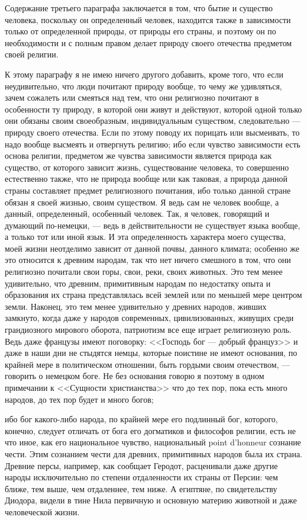 \documentclass[12pt]{article}
\begin{document}
Содержание третьего параграфа заключается в том, что бытие и существо человека, поскольку он определенный человек, находится также в зависимости только от определенной природы, от природы его страны, и поэтому он по необходимости и с полным правом делает природу своего отечества предметом своей религии. 

К этому параграфу я не имею ничего другого добавить, кроме того, что если неудивительно, что люди почитают природу вообще, то чему же удивляться, зачем сожалеть или смеяться над тем, что они религиозно почитают в особенности ту природу, в которой они живут и действуют, которой одной только они обязаны своим своеобразным, индивидуальным существом, следовательно --- природу своего отечества. Если по этому поводу их порицать или высмеивать, то надо вообще высмеять и отвергнуть религию; ибо если чувство зависимости есть основа религии, предметом же чувства зависимости является природа как существо, от которого зависит жизнь, существование человека, то совершенно естественно также, что не природа вообще или как таковая, а природа данной страны составляет предмет религиозного почитания, ибо только данной стране обязан я своей жизнью, своим существом. Я ведь сам не человек вообще, а данный, определенный, особенный человек. Так, я человек, говорящий и думающий по-немецки, --- ведь в действительности не существует языка вообще, а только тот или иной язык. И эта определенность характера моего существа, моей жизни неотделимо зависит от данной почвы, данного климата; особенно же это относится к древним народам, так что нет ничего смешного в том, что они религиозно почитали свои горы, свои, реки, своих животных. Это тем менее удивительно, что древним, примитивным народам по недостатку опыта и образования их страна представлялась всей землей или по меньшей мере центром земли. Наконец, это тем менее удивительно у древних народов, живших замкнуто, когда даже у народов современных, цивилизованных, живущих среди грандиозного мирового оборота, патриотизм все еще играет религиозную роль. Ведь даже французы имеют поговорку: <<Господь бог --- добрый француз>>  и даже в наши дни не стыдятся немцы, которые поистине не имеют основания, по крайней мере в политическом отношении, быть гордыми своим отечеством, --- говорить о немецком боге. Не без основания говорю я поэтому в одном примечании к <<Сущности христианства>>  что до тех пор, пока есть много народов, до тех пор будет и много богов; 

ибо бог какого-либо народа, по крайней мере его подлинный бог, которого, конечно, следует отличать от бога его догматиков и философов религии, есть не что иное, как его национальное чувство, национальный point d'honneur сознание чести. Этим сознанием чести для древних, примитивных народов была их страна. Древние персы, например, как сообщает Геродот, расценивали даже другие народы исключительно по степени отдаленности их страны от Персии: чем ближе, тем выше, чем отдаленнее, тем ниже. А египтяне, по свидетельству Диодора, видели в тине Нила первичную и основную материю животной и даже человеческой жизни. 
\end{document}
